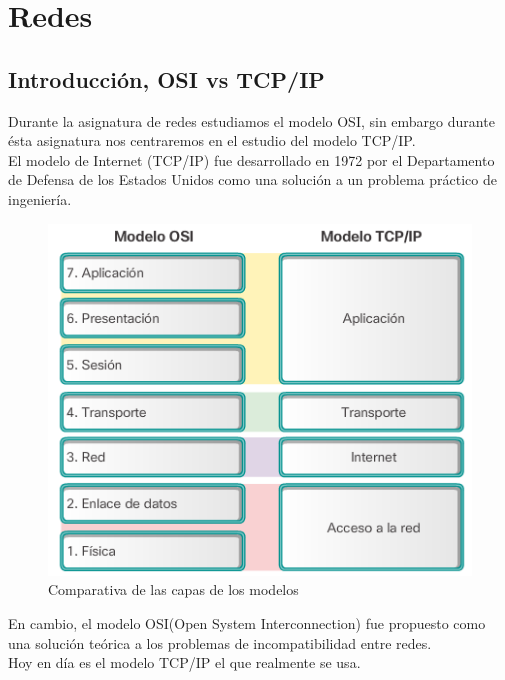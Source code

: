 \chapter{Redes}
\section{Introducción, OSI vs TCP/IP}
Durante la asignatura de redes estudiamos el modelo OSI, sin embargo durante ésta asignatura nos centraremos en el estudio del modelo TCP/IP.\\

El modelo de Internet (TCP/IP) fue desarrollado en 1972 por el Departamento de Defensa de los Estados Unidos como una solución a un problema práctico de ingeniería.
\begin{figure}[H]
    \centering
    \includegraphics{img/OSIvsTCPIP.png}
    \caption{Comparativa de las capas de los modelos}
\end{figure}

En cambio, el modelo OSI(Open System Interconnection) fue propuesto como una solución teórica a los problemas de incompatibilidad entre redes.\\

Hoy en día es el modelo TCP/IP el que realmente se usa.

